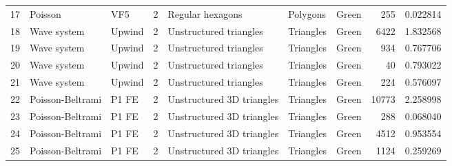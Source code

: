 \begin{tabular}{lllrlllrr}
17  &           Poisson &                            VF5 &               2 &                          Regular hexagons &               Polygons  &                                Green &                      255 &                         0.022814 \\
18  &       Wave system &                         Upwind &               2 &                    Unstructured triangles &              Triangles  &                                Green &                     6422 &                         1.832568 \\
19  &       Wave system &                         Upwind &               2 &                    Unstructured triangles &              Triangles  &                                Green &                      934 &                         0.767706 \\
20  &       Wave system &                         Upwind &               2 &                    Unstructured triangles &              Triangles  &                                Green &                       40 &                         0.793022 \\
21  &       Wave system &                         Upwind &               2 &                    Unstructured triangles &              Triangles  &                                Green &                      224 &                         0.576097 \\
22  &  Poisson-Beltrami &                          P1 FE &               2 &                 Unstructured 3D triangles &              Triangles  &                                Green &                    10773 &                         2.258998 \\
23  &  Poisson-Beltrami &                          P1 FE &               2 &                 Unstructured 3D triangles &              Triangles  &                                Green &                      288 &                         0.068040 \\
24  &  Poisson-Beltrami &                          P1 FE &               2 &                 Unstructured 3D triangles &              Triangles  &                                Green &                     4512 &                         0.953554 \\
25  &  Poisson-Beltrami &                          P1 FE &               2 &                 Unstructured 3D triangles &              Triangles  &                                Green &                     1124 &                         0.259269 \\

\end{tabular}
